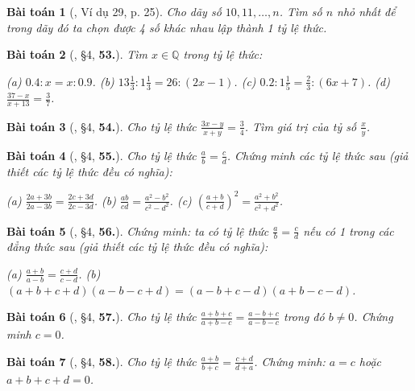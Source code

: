 \documentclass{article}
\newtheorem{baitoan}{Bài toán}
\begin{document}
\begin{baitoan}[\cite{Binh_Toan_7_tap_1}, Ví dụ 29, p. 25]
	Cho dãy số $10,11,\ldots,n$. Tìm số $n$ nhỏ nhất để trong dãy đó ta chọn được 4 số khác nhau lập thành 1 tỷ lệ thức.
\end{baitoan}

\begin{baitoan}[\cite{Binh_Toan_7_tap_1}, \S4, \textbf{53.}]
	Tìm $x\in\mathbb{Q}$ trong tỷ lệ thức:
	
		(a) $0.4:x = x:0.9$.
		(b) $13\frac{1}{3}:1\frac{1}{3} = 26:(2x - 1)$.
		(c) $0.2:1\frac{1}{5} = \frac{2}{3}:(6x + 7)$.
		(d) $\frac{37 - x}{x + 13} = \frac{3}{7}$.
	
\end{baitoan}

\begin{baitoan}[\cite{Binh_Toan_7_tap_1}, \S4, \textbf{54.}]
	Cho tỷ lệ thức $\frac{3x - y}{x + y} = \frac{3}{4}$. Tìm giá trị của tỷ số $\frac{x}{y}$.
\end{baitoan}

\begin{baitoan}[\cite{Binh_Toan_7_tap_1}, \S4, \textbf{55.}]
	Cho tỷ lệ thức $\frac{a}{b} = \frac{c}{d}$. Chứng minh các tỷ lệ thức sau (giả thiết các tỷ lệ thức đều có nghĩa):
	
		(a) $\frac{2a + 3b}{2a - 3b} = \frac{2c + 3d}{2c - 3d}$.
		(b) $\frac{ab}{cd} = \frac{a^2 - b^2}{c^2 - d^2}$.
		(c) $\left(\frac{a + b}{c + d}\right)^2 = \frac{a^2 + b^2}{c^2 + d^2}$.
	
\end{baitoan}

\begin{baitoan}[\cite{Binh_Toan_7_tap_1}, \S4, \textbf{56.}]
	Chứng minh: ta có tỷ lệ thức $\frac{a}{b} = \frac{c}{d}$ nếu có 1 trong các đẳng thức sau (giả thiết các tỷ lệ thức đều có nghĩa):
	
		(a) $\frac{a + b}{a - b} = \frac{c + d}{c - d}$.
		(b) $(a + b + c + d)(a - b - c + d) = (a - b + c - d)(a + b - c - d)$.
	
\end{baitoan}

\begin{baitoan}[\cite{Binh_Toan_7_tap_1}, \S4, \textbf{57.}]
	Cho tỷ lệ thức $\frac{a + b + c}{a + b - c} = \frac{a - b + c}{a - b - c}$ trong đó $b\ne 0$. Chứng minh $c = 0$.
\end{baitoan}

\begin{baitoan}[\cite{Binh_Toan_7_tap_1}, \S4, \textbf{58.}]
	Cho tỷ lệ thức $\frac{a + b}{b + c} = \frac{c + d}{d + a}$. Chứng minh: $a = c$ hoặc $a + b + c + d = 0$.
\end{baitoan}
\end{document}
